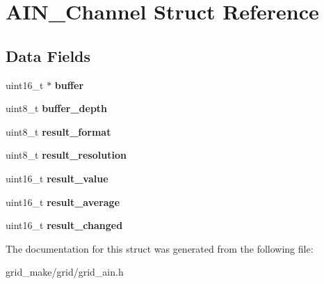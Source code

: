 \hypertarget{structAIN__Channel}{\section{A\-I\-N\-\_\-\-Channel Struct Reference}
\label{structAIN__Channel}
}
\subsection*{Data Fields}
\begin{DoxyCompactItemize}
\item 
\hypertarget{structAIN__Channel_a32e1d22598aee60a576ea2f37739482c}{uint16\-\_\-t $\ast$ {\bfseries buffer}}\label{structAIN__Channel_a32e1d22598aee60a576ea2f37739482c}

\item 
\hypertarget{structAIN__Channel_ab1077597f2318629598639b751f221aa}{uint8\-\_\-t {\bfseries buffer\-\_\-depth}}\label{structAIN__Channel_ab1077597f2318629598639b751f221aa}

\item 
\hypertarget{structAIN__Channel_ab5354353e6560c35bdbf9dc43020f2d3}{uint8\-\_\-t {\bfseries result\-\_\-format}}\label{structAIN__Channel_ab5354353e6560c35bdbf9dc43020f2d3}

\item 
\hypertarget{structAIN__Channel_a0737b5b48825998513acbe3c9e017279}{uint8\-\_\-t {\bfseries result\-\_\-resolution}}\label{structAIN__Channel_a0737b5b48825998513acbe3c9e017279}

\item 
\hypertarget{structAIN__Channel_a4f3d9978207da3f5ef82f224bd6edf2e}{uint16\-\_\-t {\bfseries result\-\_\-value}}\label{structAIN__Channel_a4f3d9978207da3f5ef82f224bd6edf2e}

\item 
\hypertarget{structAIN__Channel_ac8f0136bfe80e81d10fb8b5a1426166c}{uint16\-\_\-t {\bfseries result\-\_\-average}}\label{structAIN__Channel_ac8f0136bfe80e81d10fb8b5a1426166c}

\item 
\hypertarget{structAIN__Channel_a00df500d6bb3d8fe122932c4b7c1e8d7}{uint16\-\_\-t {\bfseries result\-\_\-changed}}\label{structAIN__Channel_a00df500d6bb3d8fe122932c4b7c1e8d7}

\end{DoxyCompactItemize}


The documentation for this struct was generated from the following file\-:\begin{DoxyCompactItemize}
\item 
grid\-\_\-make/grid/grid\-\_\-ain.\-h\end{DoxyCompactItemize}
